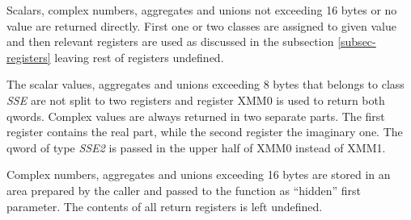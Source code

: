 Scalars, complex numbers, aggregates and unions not exceeding 16 bytes or no
value are returned directly.  First one or two classes are assigned to given
value and then relevant registers are used as discussed in the subsection
\ref{subsec-registers} leaving rest of registers undefined.

The scalar values, aggregates and unions exceeding 8 bytes that
belongs to class \emph{SSE} are not split to two registers and
register XMM0 is used to return both qwords.  Complex values are
always returned in two separate parts.  The first register contains
the real part, while the second register the imaginary one. The qword
of type \emph{SSE2} is passed in the upper half of XMM0 instead of
XMM1.

Complex numbers, aggregates and unions exceeding 16 bytes are stored
in an area prepared by the caller and passed to the function as
``hidden'' first parameter.  The contents of all return registers is
left undefined.



